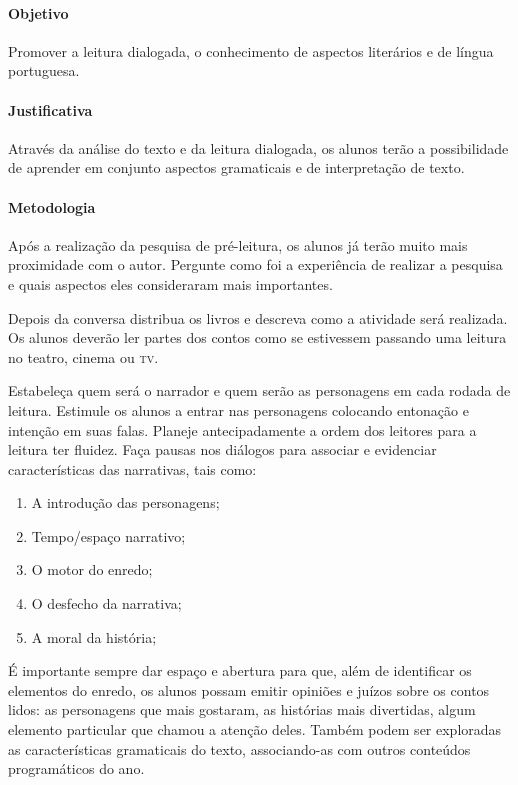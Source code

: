\documentclass[11pt]{extarticle}
\begin{document}
\paragraph{Objetivo} Promover a leitura dialogada, o conhecimento de aspectos literários e de língua portuguesa.

\paragraph{Justificativa} Através da análise do texto e da leitura dialogada, os alunos terão a possibilidade de aprender em conjunto aspectos gramaticais e de interpretação de texto.


\paragraph{Metodologia} Após a realização da pesquisa de pré-leitura, os alunos já terão muito mais proximidade com o autor. Pergunte como foi a experiência de realizar a pesquisa e quais aspectos eles consideraram mais importantes.

Depois da conversa distribua os livros e descreva como a atividade será realizada. Os alunos deverão ler partes dos contos como se estivessem passando uma leitura no teatro, cinema ou \textsc{tv}.

Estabeleça quem será o narrador e quem serão as personagens em cada rodada de leitura. Estimule os alunos a entrar nas personagens colocando entonação e intenção em suas falas. Planeje antecipadamente a ordem dos leitores para a leitura ter fluidez. Faça pausas nos diálogos para associar e evidenciar características das narrativas, tais como:

\begin{enumerate}
\item A introdução das personagens;

\item Tempo/espaço narrativo;

\item O motor do enredo;

\item O desfecho da narrativa;

\item A moral da história;
\end{enumerate}

É importante sempre dar espaço e abertura para que, além de identificar os elementos do enredo, os alunos possam emitir opiniões e juízos sobre os contos lidos: as personagens que mais gostaram, as histórias mais divertidas, algum elemento particular que chamou a atenção deles. Também podem ser exploradas as características gramaticais do texto, associando-as com outros conteúdos programáticos do ano. 
\end{document}
